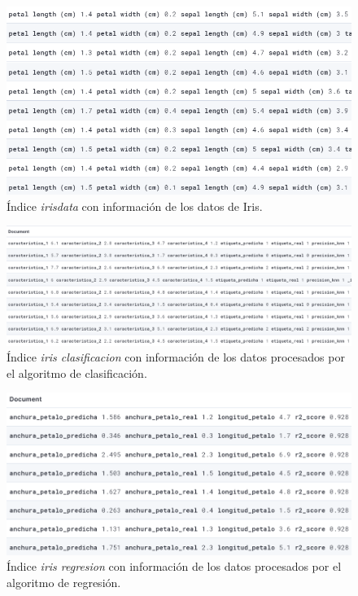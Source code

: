 \begin{figure}
    \centering
    \includegraphics[width=1\linewidth]{img/iris13.png}
    \caption{Índice \textit{irisdata} con información de los datos de Iris.}
    \label{fig:index1}
\end{figure}


\begin{figure}
    \centering
    \includegraphics[width=1\linewidth]{img/iris14.png}
    \caption{Índice \textit{iris clasificacion} con información de los datos procesados por el algoritmo de clasificación.}
    \label{fig:index2}
\end{figure}


\begin{figure}
    \centering
    \includegraphics[width=1\linewidth]{img/iris15.png}
    \caption{Índice \textit{iris regresion} con información de los datos procesados por el algoritmo de regresión.}
    \label{fig:index3}
\end{figure}


